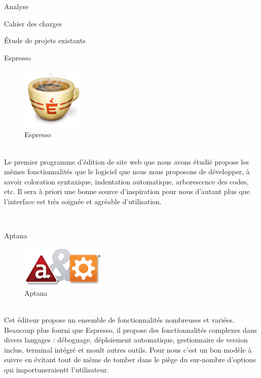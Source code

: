 \documentclass[a4paper, 12pt]{report}
\begin{document}
\begin{part}{Analyse}
\begin{chapter}{Cahier des charges}
			~\\
		\end{chapter}
		\begin{chapter}{Étude de projets existants}
		\begin{section}{Espresso}
				\begin{figure}[h]
					\begin{center}
						\includegraphics[width=3cm]{images/logoEspresso.png}
						\caption{Espresso}
					\end{center}
				\end{figure}~\\
				Le premier programme d'édition de site web que nous avons étudié propose les mêmes fonctionnalités que le
				logiciel que nous nous proposons de développer, à savoir coloration syntaxique, indentation automatique, arborescence des codes, etc.
				Il sera à priori une bonne source d'inspiration pour nous d'autant plus que l'interface est très soignée et agréable d'utilisation.
			\end{section}
			~\\
			\begin{section}{Aptana}
				\begin{figure}[h]
					\begin{center}
						\includegraphics[width=4cm]{images/logoAptana.png}
						\caption{Aptana}
					\end{center}
				\end{figure}~\\
				Cet éditeur propose un ensemble de fonctionnalités nombreuses et variées. Beaucoup plus fourni que Espresso, il propose des fonctionnalités complexes dans divers langages : déboguage, déploiement automatique, gestionnaire de version inclus, terminal intégré et moult autres outils.
				Pour nous c'est un bon modèle à suivre en évitant tout de même de tomber dans le piège du sur-nombre d'options qui importuneraientt l'utilisateur. 
			\end{section}

\end{chapter}
\end{part}
\end{document}
